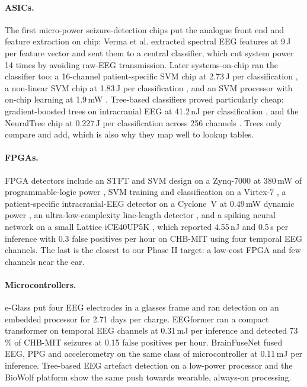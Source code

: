 \paragraph{ASICs.} The first micro-power seizure-detection chips put the analogue front end and feature extraction on
chip: Verma et al. \cite{verma2010micro} extracted spectral EEG features at 9\,\textmu J per feature vector and sent them
to a central classifier, which cut system power 14 times by avoiding raw-EEG transmission. Later systems-on-chip ran
the classifier too: a 16-channel patient-specific SVM chip at 2.73\,\textmu J per classification \cite{altaf2015jssc},
a non-linear SVM chip at 1.83\,\textmu J per classification \cite{altaf2016tbcas}, and an SVM processor with on-chip
learning at 1.9\,mW \cite{huang2020jssc}. Tree-based classifiers proved particularly cheap: gradient-boosted trees on
intracranial EEG at 41.2\,nJ per classification \cite{shoaran2018jetcas}, and the NeuralTree chip at
0.227\,\textmu J per classification across 256 channels \cite{shin2022neuraltree}. Trees only compare and add, which is
also why they map well to lookup tables.

\paragraph{FPGAs.} FPGA detectors include an STFT and SVM design on a Zynq-7000 at 380\,mW of programmable-logic power
\cite{wang2018access}, SVM training and classification on a Virtex-7 \cite{elhosary2019tbcas}, a patient-specific
intracranial-EEG detector on a Cyclone~V at 0.49\,mW dynamic power \cite{razi2022tbcas}, an ultra-low-complexity
line-length detector \cite{vittimberga2025sensors}, and a spiking neural network on a small Lattice iCE40UP5K
\cite{busia2025fpga}, which reported 4.55\,nJ and 0.5\,\textmu s per inference with 0.3 false positives per hour on
CHB-MIT using four temporal EEG channels. The last is the closest to our Phase II target: a low-cost FPGA and few
channels near the ear.

\paragraph{Microcontrollers.} e-Glass \cite{sopic2018eglass} put four EEG electrodes in a glasses frame and ran
detection on an embedded processor for 2.71 days per charge. EEGformer \cite{busia2024eegformer} ran a compact
transformer on temporal EEG channels at 0.31\,mJ per inference and detected 73\,\% of CHB-MIT seizures at 0.15 false
positives per hour. BrainFuseNet \cite{ingolfsson2024brainfusenet} fused EEG, PPG and accelerometry on the same class
of microcontroller at 0.11\,mJ per inference. Tree-based EEG artefact detection on a low-power processor
\cite{ingolfsson2022artifact} and the BioWolf platform \cite{kartsch2019biowolf} show the same push towards wearable,
always-on processing.

